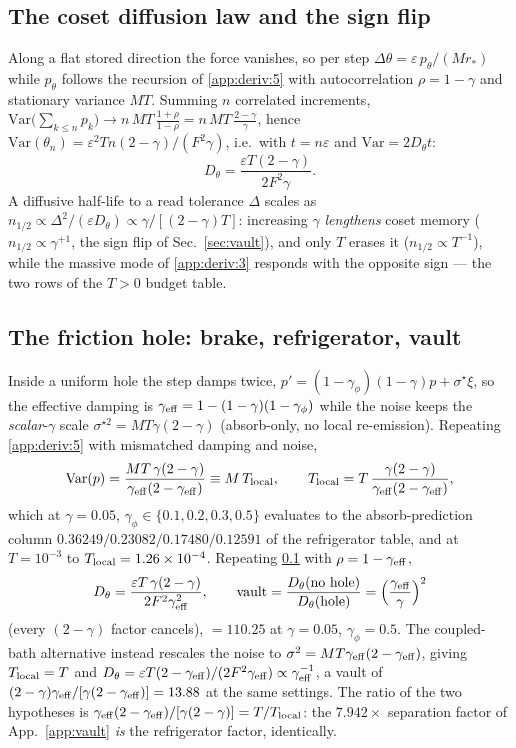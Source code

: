 \documentclass{article}
\begin{document}
\subsection{The coset diffusion law and the sign flip}\label{app:deriv:6} Along a flat stored direction the force vanishes, so per step $\Delta\theta=\varepsilon\,p_\theta/(Mr_*)$ while $p_\theta$ follows the recursion of \ref{app:deriv:5} with autocorrelation $\rho=1-\gamma$ and stationary variance $M T$. Summing $n$ correlated increments, $\mathrm{Var}\bigl(\sum_{k\le n}p_k\bigr)\to n\,MT\,\tfrac{1+\rho}{1-\rho}=n\,MT\,\tfrac{2-\gamma}{\gamma}$, hence $\mathrm{Var}(\theta_n)=\varepsilon^2Tn(2-\gamma)/(F^2\gamma)$, i.e.\ with $t=n\varepsilon$ and $\mathrm{Var}=2D_\theta t$:
\[
D_\theta=\frac{\varepsilon T(2-\gamma)}{2F^2\gamma}.
\]
A diffusive half-life to a read tolerance $\Delta$ scales as $n_{1/2}\propto\Delta^2/(\varepsilon D_\theta)\propto\gamma/[(2-\gamma)T]$: increasing $\gamma$ \emph{lengthens} coset memory ($n_{1/2}\propto\gamma^{+1}$, the sign flip of Sec.~\ref{sec:vault}), and only $T$ erases it ($n_{1/2}\propto T^{-1}$), while the massive mode of \ref{app:deriv:3} responds with the opposite sign --- the two rows of the $T>0$ budget table.

\subsection{The friction hole: brake, refrigerator, vault}\label{app:deriv:7} Inside a uniform hole the step damps twice, $p'=(1-\gamma_\phi)(1-\gamma)p+\sigma^\star\xi$, so the effective damping is $\gamma_{\rm eff}=1-(1-\gamma)(1-\gamma_\phi)$ while the noise keeps the \emph{scalar}-$\gamma$ scale $\sigma^{\star2}=MT\gamma(2-\gamma)$ (absorb-only, no local re-emission). Repeating \ref{app:deriv:5} with mismatched damping and noise,
\[
\mathrm{Var}(p)=\frac{MT\,\gamma(2-\gamma)}{\gamma_{\rm eff}(2-\gamma_{\rm eff})}\equiv M\,T_{\rm local},
\qquad
T_{\rm local}=T\,\frac{\gamma(2-\gamma)}{\gamma_{\rm eff}(2-\gamma_{\rm eff})},
\]
which at $\gamma=0.05$, $\gamma_\phi\in\{0.1,0.2,0.3,0.5\}$ evaluates to the absorb-prediction column $0.36249/0.23082/0.17480/0.12591$ of the refrigerator table, and at $T=10^{-3}$ to $T_{\rm local}=1.26\times10^{-4}$. Repeating \ref{app:deriv:6} with $\rho=1-\gamma_{\rm eff}$,
\[
D_\theta=\frac{\varepsilon T\,\gamma(2-\gamma)}{2F^2\gamma_{\rm eff}^2},
\qquad
\text{vault}=\frac{D_\theta(\text{no hole})}{D_\theta(\text{hole})}=\Bigl(\frac{\gamma_{\rm eff}}{\gamma}\Bigr)^{2}
\]
(every $(2-\gamma)$ factor cancels), $=110.25$ at $\gamma=0.05$, $\gamma_\phi=0.5$. The coupled-bath alternative instead rescales the noise to $\sigma^2=MT\gamma_{\rm eff}(2-\gamma_{\rm eff})$, giving $T_{\rm local}=T$ and $D_\theta=\varepsilon T(2-\gamma_{\rm eff})/(2F^2\gamma_{\rm eff})\propto\gamma_{\rm eff}^{-1}$, a vault of $(2-\gamma)\gamma_{\rm eff}/[\gamma(2-\gamma_{\rm eff})]=13.88$ at the same settings. The ratio of the two hypotheses is $\gamma_{\rm eff}(2-\gamma_{\rm eff})/[\gamma(2-\gamma)]=T/T_{\rm local}$: the $7.942\times$ separation factor of App.~\ref{app:vault} \emph{is} the refrigerator factor, identically.
\end{document}
